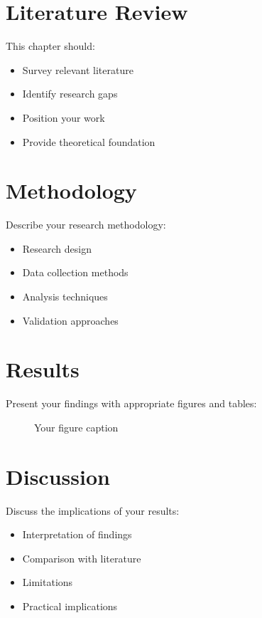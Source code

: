\documentclass[12pt]{report}
\begin{document}
\chapter{Literature Review}
This chapter should:
\begin{itemize}
    \item Survey relevant literature
    \item Identify research gaps
    \item Position your work
    \item Provide theoretical foundation
\end{itemize}

\chapter{Methodology}
Describe your research methodology:
\begin{itemize}
    \item Research design
    \item Data collection methods
    \item Analysis techniques
    \item Validation approaches
\end{itemize}

\chapter{Results}
Present your findings with appropriate figures and tables:

\begin{figure}[h]
\centering
\caption{Your figure caption}
\label{fig:example}
\end{figure}

\chapter{Discussion}
Discuss the implications of your results:
\begin{itemize}
    \item Interpretation of findings
    \item Comparison with literature
    \item Limitations
    \item Practical implications
\end{itemize}
\end{document}
